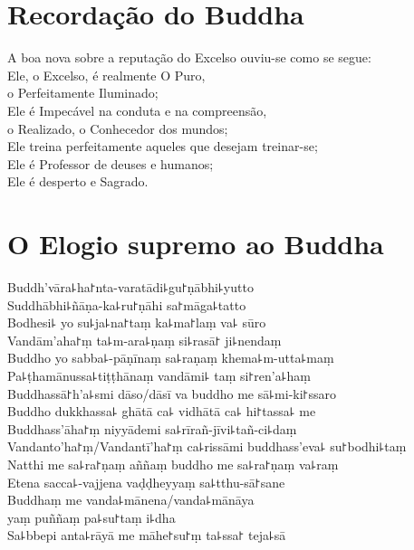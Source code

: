 \chapter{Recordação do Buddha}

\begin{leader}
\end{leader}

A boa nova sobre a reputação do Excelso ouviu-se como se segue:\\
Ele, o Excelso, é realmente O Puro,\\
\vin o Perfeitamente Iluminado;\\
Ele é Impecável na conduta e na compreensão,\\
\vin o Realizado, o Conhecedor dos mundos;\\
Ele treina perfeitamente aqueles que desejam treinar-se;\\
Ele é Professor de deuses e humanos;\\
Ele é desperto e Sagrado.

\clearpage

\chapter*{O Elogio supremo ao Buddha}

\delegateSetUseNext

\begin{leader}
\end{leader}

Buddh'vāra꜕ha꜓nta-varatādi꜕gu꜓ṇābhi꜕yutto\\
Suddhābhi꜕ñāṇa-ka꜕ru꜓ṇāhi sa꜓māga꜕tatto\\
Bodhesi꜕ yo su꜕ja꜕na꜓taṃ ka꜕ma꜓laṃ va꜕ sūro\\
Vandām'aha꜓ṃ ta꜕m-ara꜕ṇaṃ si꜕rasā꜓ ji꜕nendaṃ\\
Buddho yo sabba꜕-pāṇīnaṃ sa꜕raṇaṃ khema꜕m-utta꜕maṃ\\
Pa꜕ṭhamānussa꜕tiṭṭhānaṃ vandāmi꜕ taṃ si꜓ren'a꜕haṃ\\
Buddhassā꜓h'a꜕smi dāso/dāsī va buddho me sā꜕mi-ki꜓ssaro\\
Buddho dukkhassa꜕ ghātā ca꜕ vidhātā ca꜕ hi꜓tassa꜕ me\\
Buddhass'āha꜓ṃ niyyādemi sa꜕rīrañ-jīvi꜕tañ-ci꜕daṃ\\
Vandanto'ha꜓ṃ/Vandantī'ha꜓ṃ ca꜕rissāmi buddhass'eva꜕ su꜓bodhi꜕taṃ\\
Natthi me sa꜕ra꜓ṇaṃ aññaṃ buddho me sa꜕ra꜓ṇaṃ va꜕raṃ\\
Etena sacca꜕-vajjena vaḍḍheyyaṃ sa꜕tthu-sā꜓sane\\
Buddhaṃ me vanda꜕mānena/vanda꜕mānāya\\
\vin yaṃ puññaṃ pa꜕su꜓taṃ i꜕dha\\
Sa꜕bbepi anta꜕rāyā me māhe꜓su꜓ṃ ta꜕ssa꜓ teja꜕sā

